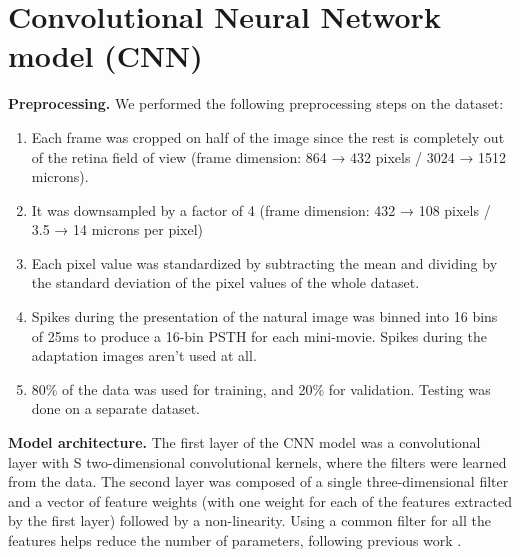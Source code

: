 \newpage
\appendix
\setcounter{equation}{0}      
\section{Convolutional Neural Network model (CNN)}\label{app:CNN}

\textbf{Preprocessing.}
We performed the following preprocessing steps on the dataset:
\begin{enumerate}
    \item Each frame was cropped on half of the image since the rest is
          completely out of the retina field of view (frame dimension: 864 →
          432
          pixels / 3024 → 1512 microns).
    \item It was downsampled by a factor of 4 (frame dimension: 432 → 108 pixels /
          3.5 → 14 microns per pixel)
    \item Each pixel value was standardized by subtracting the mean and
          dividing
          by the standard deviation of the pixel values of the whole dataset.
    \item Spikes during the presentation of the natural image was binned into
          16 bins of 25ms to produce a 16-bin PSTH for each mini-movie. Spikes
          during the
          adaptation images aren’t used at all.
    \item 80\% of the data was used for training, and 20\% for validation.
          Testing was done on a separate dataset.
\end{enumerate}

\textbf{Model architecture.}
The first layer of the CNN model was a convolutional layer with S
two-dimensional convolutional kernels, where the filters were learned from the
data.
The second layer was composed of a single three-dimensional filter and a vector
of feature weights (with one weight
for each of the features extracted by the first layer) followed by a
non-linearity.
Using a common filter for all the features helps reduce the number of
parameters, following previous work \citep{cadena_deep_2019}.

